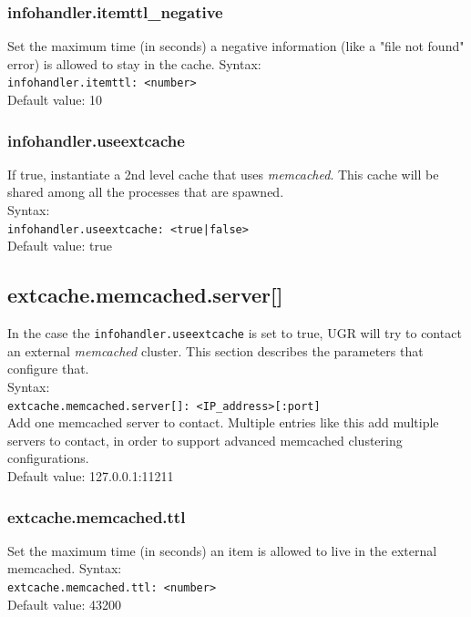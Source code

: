 \documentclass[12pt]{article} %
\begin{document}
\subsubsection{infohandler.itemttl\_negative}
Set the maximum time (in seconds) a negative information (like a "file not found" error) is allowed to stay in the cache.
Syntax:\\
\verb"infohandler.itemttl: <number>"\\
Default value: 10


\subsubsection{infohandler.useextcache}
If true, instantiate a 2nd level cache that uses \textit{memcached}. This cache will be shared among all the processes that are spawned.\\
Syntax:\\
\verb"infohandler.useextcache: <true|false>"\\
Default value: true

\subsection{extcache.memcached.server[]}
In the case the \verb"infohandler.useextcache" is set to true, UGR will try to contact an external \textit{memcached} cluster.  This section describes the parameters that configure that.\\

 Syntax:\\

\verb"extcache.memcached.server[]: <IP_address>[:port]"\\

Add one memcached server to contact. Multiple entries like this add multiple servers to contact, in order to support advanced memcached clustering configurations.\\

Default value: 127.0.0.1:11211

\subsubsection{extcache.memcached.ttl}
Set the maximum time (in seconds) an item is allowed to live in the external memcached.
Syntax:\\
\verb"extcache.memcached.ttl: <number>"\\
Default value: 43200\\
\end{document}
